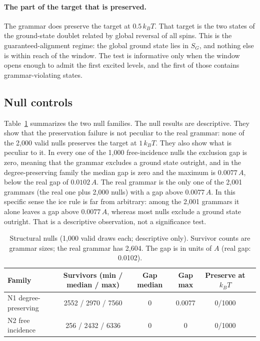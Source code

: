 \documentclass[11pt,a4paper]{article}
\theoremstyle{plain}
\theoremstyle{definition}
\theoremstyle{remark}
\newcommand{\SG}{S_{G}}
\newcommand{\kBT}{k_{B}T}
\begin{document}
\paragraph{The part of the target that is preserved.}
The grammar does preserve the target at $0.5\,\kBT$. That target is the two states of the ground-state doublet related by global reversal of all spins. This is the guaranteed-alignment regime: the global ground state lies in $\SG$, and nothing else is within reach of the window. The test is informative only when the window opens enough to admit the first excited levels, and the first of those contains grammar-violating states.

\subsection{Null controls}
Table~\ref{tab:nulls} summarizes the two null families. The null results are descriptive. They show that the preservation failure is not peculiar to the real grammar: none of the 2{,}000 valid nulls preserves the target at $1\,\kBT$. They also show what is peculiar to it. In every one of the 1{,}000 free-incidence nulls the exclusion gap is zero, meaning that the grammar excludes a ground state outright, and in the degree-preserving family the median gap is zero and the maximum is $0.0077\,A$, below the real gap of $0.0102\,A$. The real grammar is the only one of the 2{,}001 grammars (the real one plus 2{,}000 nulls) with a gap above $0.0077\,A$. In this specific sense the ice rule is far from arbitrary: among the 2{,}001 grammars it alone leaves a gap above $0.0077\,A$, whereas most nulls exclude a ground state outright. That is a descriptive observation, not a significance test.

\begin{table}[t]
\centering\small
\caption{Structural nulls (1{,}000 valid draws each; descriptive only). Survivor counts are grammar sizes; the real grammar has 2{,}604. The gap is in units of $A$ (real gap: 0.0102).}
\label{tab:nulls}
\begin{tabular}{@{}lccccc@{}}
\toprule
Family & Survivors (min / median / max) & Gap median & Gap max & Preserve at $\kBT$\\
\midrule
N1 degree-preserving & 2552 / 2970 / 7560 & 0 & 0.0077 & 0/1000\\
N2 free incidence & 256 / 2432 / 6336 & 0 & 0 & 0/1000\\
\bottomrule
\end{tabular}
\end{table}
\end{document}
